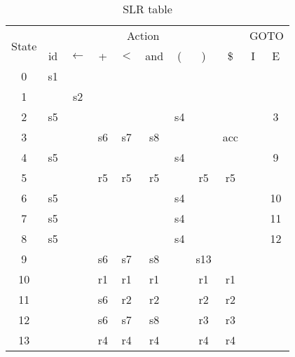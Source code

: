 \begin{table}[H]
  \centering
  \begin{tabular}{|c||c|c|c|c|c|c|c|c||c|c|}
    \hline
    \multirow{2}{*}{State} & \multicolumn{8}{c||}{Action} & \multicolumn{2}{c|}{GOTO}\\
    \cline{2-11} & id & $\leftarrow$ & + & $<$ & and & ( & ) &\$ & I & E\\
    \hline
    0  &s1 &   &   &   &   &   &   &   &   &\\
    \hline
    1  &   &s2 &   &   &   &   &   &   &   &\\
    \hline
    2  &s5 &   &   &   &   &s4 &   &   &   &3\\
    \hline
    3  &   &   &s6 &s7 &s8 &   &   &acc&   &\\
    \hline
    4  &s5 &   &   &   &   &s4 &   &   &   &9\\
    \hline
    5  &   &   &r5 &r5 &r5 &   &r5 &r5 &   &\\
    \hline
    6   &s5 &   &   &   &   &s4 &   &   &   &10\\
    \hline
    7   &s5 &   &   &   &   &s4 &   &   &   &11\\
    \hline
    8   &s5 &   &   &   &   &s4 &   &   &   &12\\
    \hline
    9   &   &   &s6 &s7 &s8 &   &s13&   &   &\\
    \hline
    10  &   &   &r1 &r1 &r1 &   &r1 &r1 &   &\\
    \hline
    11  &   &   &s6 &r2 &r2 &   &r2 &r2 &   &\\
    \hline
    12  &   &   &s6 &s7 &s8 &   &r3 &r3 &   &\\
    \hline
    13  &   &   &r4 &r4 &r4 &   &r4 &r4 &   &\\
    \hline
  \end{tabular}
  \caption{SLR table}
\end{table}
